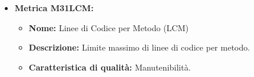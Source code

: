 \begin{itemize}
    \item \textbf{Metrica M31LCM:}
          \begin{itemize}
              \item \textbf{Nome:} Linee di Codice per Metodo (LCM)
              \item \textbf{Descrizione:} Limite massimo di linee di codice per metodo.
              \item \textbf{Caratteristica di qualità:} Manutenibilità.
          \end{itemize} 
\end{itemize}